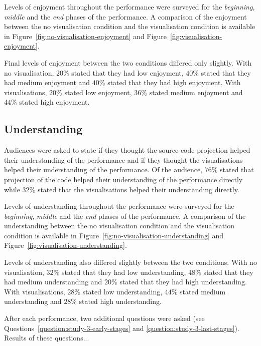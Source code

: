 Levels of enjoyment throughout the performance were surveyed for the \emph{beginning}, \emph{middle} and the \emph{end} phases of the performance. A comparison of the enjoyment between the no visualisation condition and the visualisation condition is available in Figure~\ref{fig:no-visualisation-enjoyment} and Figure~\ref{fig:visualisation-enjoyment}.

Final levels of enjoyment between the two conditions differed only slightly. With no visualisation, $20\%$ stated that they had low enjoyment, $40\%$ stated that they had medium enjoyment and $40\%$ stated that they had high enjoyment. With visualisations, $20\%$ stated low enjoyment, $36\%$ stated medium enjoyment and $44\%$ stated high enjoyment.

\subsection{Understanding}



Audiences were asked to state if they thought the source code projection helped their understanding of the performance and if they thought the visualisations helped their understanding of the performance. Of the audience, $76\%$ stated that projection of the code helped their understanding of the performance directly while $32\%$ stated that the visualisations helped their understanding directly.

Levels of understanding throughout the performance were surveyed for the \emph{beginning}, \emph{middle} and the \emph{end} phases of the performance. A comparison of the understanding between the no visualisation condition and the visualisation condition is available in Figure~\ref{fig:no-visualisation-understanding} and Figure~\ref{fig:visualisation-understanding}.

Levels of understanding also differed slightly between the two conditions. With no visualisation, $32\%$ stated that they had low understanding, $48\%$ stated that they had medium understanding and $20\%$ stated that they had high understanding. With visualisations, $28\%$ stated low understanding, $44\%$ stated medium understanding and $28\%$ stated high understanding.

After each performance, two additional questions were asked (see Questions~\ref{question:study-3-early-stages} and \ref{question:study-3-last-stages}). Results of these questions... \more

